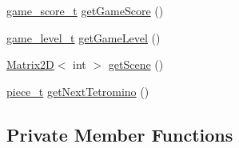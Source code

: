 \begin{DoxyCompactItemize}
\item 
\hyperlink{structgame__score__t}{game\+\_\+score\+\_\+t} \hyperlink{classTetreesEngine_a46108b9a7ea4ab8ebd27323f9752e208}{get\+Game\+Score} ()
\item 
\hyperlink{structgame__level__t}{game\+\_\+level\+\_\+t} \hyperlink{classTetreesEngine_a7ad503b48ba753c446e5438ca67aa4e3}{get\+Game\+Level} ()
\item 
\hyperlink{classMatrix2D}{Matrix2D}$<$ int $>$ \hyperlink{classTetreesEngine_a1f167b42fc077d496449a2cc959989ac}{get\+Scene} ()
\item 
\hyperlink{structpiece__t}{piece\+\_\+t} \hyperlink{classTetreesEngine_a78698174a309f2a4d74da9fd47167f56}{get\+Next\+Tetromino} ()
\end{DoxyCompactItemize}
\subsection*{Private Member Functions}
